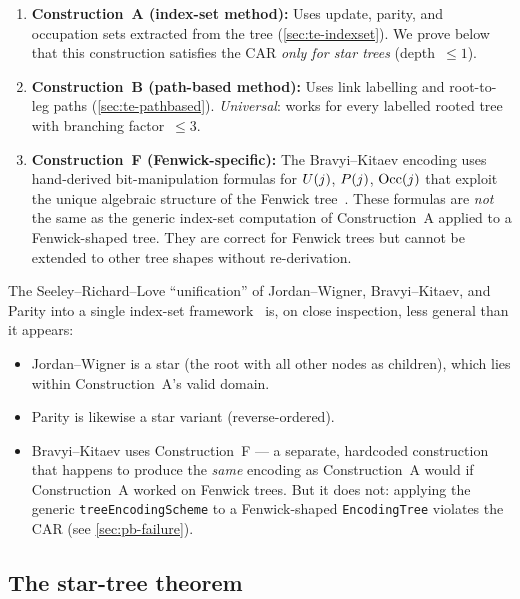 \begin{enumerate}
  \item \textbf{Construction~A (index-set method):} Uses update,
    parity, and occupation sets extracted from the tree
    (\cref{sec:te-indexset}).  We prove below that this construction
    satisfies the CAR \emph{only for star trees} (depth~$\le 1$).

  \item \textbf{Construction~B (path-based method):} Uses link
    labelling and root-to-leg paths
    (\cref{sec:te-pathbased}).  \emph{Universal}: works for every
    labelled rooted tree with branching factor~$\le 3$.

  \item \textbf{Construction~F (Fenwick-specific):} The
    Bravyi--Kitaev encoding uses hand-derived bit-manipulation formulas
    for $U(j)$, $P(j)$, $\mathrm{Occ}(j)$ that exploit the unique
    algebraic structure of the Fenwick tree~\cite{fenwick1994}.  These
    formulas are \emph{not} the same as the generic index-set
    computation of Construction~A applied to a Fenwick-shaped tree.
    They are correct for Fenwick trees but cannot be extended to
    other tree shapes without re-derivation.
\end{enumerate}

The Seeley--Richard--Love ``unification'' of Jordan--Wigner,
Bravyi--Kitaev, and Parity into a single index-set
framework~\cite{seeley2012} is, on close inspection, less general
than it appears:
\begin{itemize}
  \item Jordan--Wigner is a star (the root with all other nodes as
    children), which lies within Construction~A's valid domain.
  \item Parity is likewise a star variant (reverse-ordered).
  \item Bravyi--Kitaev uses Construction~F --- a separate, hardcoded
    construction that happens to produce the \emph{same} encoding as
    Construction~A would if Construction~A worked on Fenwick trees.
    But it does not: applying the generic \texttt{treeEncodingScheme}
    to a Fenwick-shaped \texttt{EncodingTree} violates the CAR (see
    \cref{sec:pb-failure}).
\end{itemize}

\subsection{The star-tree theorem}
\label{sec:pb-theorem}

